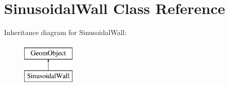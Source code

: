 \hypertarget{classSinusoidalWall}{}\section{Sinusoidal\+Wall Class Reference}
\label{classSinusoidalWall}
Inheritance diagram for Sinusoidal\+Wall\+:\begin{figure}[H]
\begin{center}
\leavevmode
\includegraphics[height=2.000000cm]{classSinusoidalWall}
\end{center}
\end{figure}
